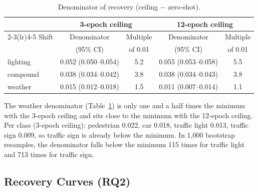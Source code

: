\begin{table}[t]
\centering
\caption{Denominator of recovery (ceiling $-$ zero-shot).}
\label{tab:denom}
\footnotesize
\setlength{\tabcolsep}{3pt}
\begin{tabular}{@{}lcccc@{}}
\toprule
 & \multicolumn{2}{c}{3-epoch ceiling} & \multicolumn{2}{c}{12-epoch ceiling} \\
\cmidrule(lr){2-3}\cmidrule(lr){4-5}
Shift & Denominator & Multiple & Denominator & Multiple \\
 & (95\% CI) & of 0.01 & (95\% CI) & of 0.01 \\
\midrule
lighting & 0.052 (0.050--0.054) & 5.2 & 0.055 (0.053--0.058) & 5.5 \\
compound & 0.038 (0.034--0.042) & 3.8 & 0.038 (0.034--0.043) & 3.8 \\
weather  & 0.015 (0.012--0.018) & 1.5 & 0.011 (0.007--0.014) & 1.1 \\
\bottomrule
\end{tabular}
\end{table}

The weather denominator (Table~\ref{tab:denom}) is only one and a half times the minimum with the 3-epoch ceiling and sits close to the minimum with the 12-epoch ceiling. Per class (3-epoch ceiling): pedestrian 0.022, car 0.018, traffic light 0.013, traffic sign 0.009, so traffic sign is already below the minimum. In 1,000 bootstrap resamples, the denominator falls below the minimum 115 times for traffic light and 713 times for traffic sign.

\subsection{Recovery Curves (RQ2)}\label{sec:recovery}

